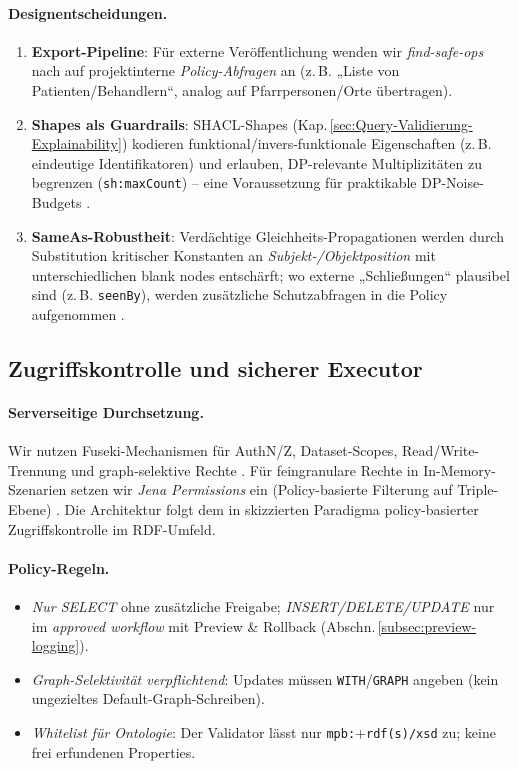 \paragraph{Designentscheidungen.}
\begin{enumerate}
  \item \textbf{Export-Pipeline}: Für externe Veröffentlichung wenden wir \emph{find-safe-ops} nach \cite{delanaux_rdf_graph_anonymization_linkage} auf projektinterne \emph{Policy-Abfragen} an (z.\,B. „Liste von Patienten/Behandlern“, analog auf Pfarrpersonen/Orte übertragen). 
  \item \textbf{Shapes als Guardrails}: SHACL-Shapes (Kap.\,\ref{sec:Query-Validierung-Explainability}) kodieren funktional/invers-funktionale Eigenschaften (z.\,B. eindeutige Identifikatoren) und erlauben, DP-relevante Multiplizitäten zu begrenzen (\texttt{sh:maxCount}) – eine Voraussetzung für praktikable DP-Noise-Budgets \cite{buil_aranda_dp_sparql}.
  \item \textbf{SameAs-Robustheit}: Verdächtige Gleichheits-Propagationen werden durch Substitution kritischer Konstanten an \emph{Subjekt-/Objektposition} mit unterschiedlichen blank nodes entschärft; wo externe „Schließungen“ plausibel sind (z.\,B. \texttt{seenBy}), werden zusätzliche Schutzabfragen in die Policy aufgenommen \cite{delanaux_rdf_graph_anonymization_linkage}.
\end{enumerate}

\subsection{Zugriffskontrolle und sicherer Executor}
\label{subsec:access-control}

\paragraph{Serverseitige Durchsetzung.}
Wir nutzen Fuseki-Mechanismen für AuthN/Z, Dataset-Scopes, Read/Write-Trennung und graph-selektive Rechte \cite{jena_fuseki_access_control_docs}. Für feingranulare Rechte in In-Memory-Szenarien setzen wir \emph{Jena Permissions} ein (Policy-basierte Filterung auf Triple-Ebene) \cite{jena_permissions_docs}. Die Architektur folgt dem in \cite{kirrane2018access_control_rdf_survey} skizzierten Paradigma policy-basierter Zugriffskontrolle im RDF-Umfeld.

\paragraph{Policy-Regeln.}
\begin{itemize}
  \item \emph{Nur SELECT} ohne zusätzliche Freigabe; \emph{INSERT/DELETE/UPDATE} nur im \emph{approved workflow} mit Preview \& Rollback (Abschn.\,\ref{subsec:preview-logging}).
  \item \emph{Graph-Selektivität verpflichtend}: Updates müssen \texttt{WITH}/\texttt{GRAPH} angeben (kein ungezieltes Default-Graph-Schreiben).
  \item \emph{Whitelist für Ontologie}: Der Validator lässt nur \texttt{mpb:}+\texttt{rdf(s)/xsd} zu; keine frei erfundenen Properties.
\end{itemize}

